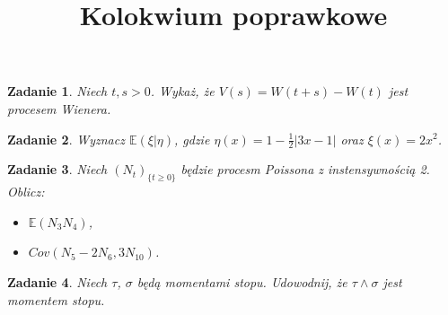 \documentclass{mwart}
\title{Kolokwium poprawkowe}
\newtheorem{zd}{Zadanie}
\begin{document}

\maketitle

\begin{zd}
Niech $t, s >0$. Wykaż, że $V(s) = W(t+s) - W(t)$ jest procesem Wienera.
\end{zd}

\begin{zd}
Wyznacz $\mathbb{E}(\xi|\eta)$, gdzie $\eta(x) = 1- \frac{1}{2}|3x-1|$ oraz $\xi(x) = 2x^2$.
\end{zd}

\begin{zd}
Niech $(N_t)_{\{t \geq 0\}}$ będzie procesm Poissona z instensywnością 2. Oblicz:
\begin{itemize}
\item $\mathbb{E}(N_3N_4)$,
\item $Cov(N_5-2N_6, 3N_{10})$.
\end{itemize}
\end{zd}

\begin{zd}
Niech $\tau$, $\sigma$ będą momentami stopu. Udowodnij, że $\tau \land \sigma$ jest momentem stopu.
\end{zd}
\end{document}
